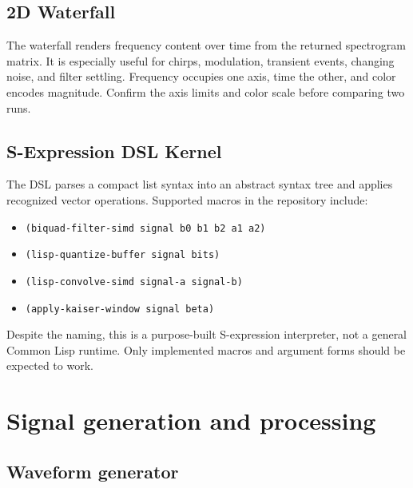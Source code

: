 \documentclass[10pt,a4paper]{article}
\newcommand{\code}[1]{\nolinkurl{#1}}
\begin{document}
\subsection{2D Waterfall}

The waterfall renders frequency content over time from the returned spectrogram matrix. It is especially useful for chirps, modulation, transient events, changing noise, and filter settling. Frequency occupies one axis, time the other, and color encodes magnitude. Confirm the axis limits and color scale before comparing two runs.

\subsection{S-Expression DSL Kernel}

The DSL parses a compact list syntax into an abstract syntax tree and applies recognized vector operations. Supported macros in the repository include:

\begin{itemize}
  \item \code{(biquad-filter-simd signal b0 b1 b2 a1 a2)}
  \item \code{(lisp-quantize-buffer signal bits)}
  \item \code{(lisp-convolve-simd signal-a signal-b)}
  \item \code{(apply-kaiser-window signal beta)}
\end{itemize}

Despite the naming, this is a purpose-built S-expression interpreter, not a general Common Lisp runtime. Only implemented macros and argument forms should be expected to work.

\section{Signal generation and processing}

\subsection{Waveform generator}
\end{document}
